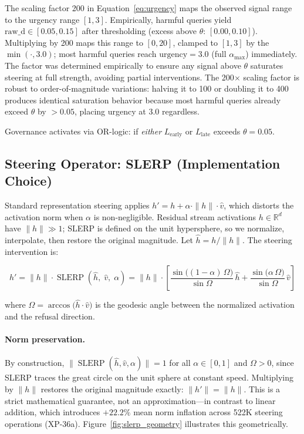 \documentclass{article}
\begin{document}
The scaling factor 200 in Equation~\ref{eq:urgency} maps the observed signal range
to the urgency range $[1, 3]$.
Empirically, harmful queries yield $\text{raw\_d} \in [0.05, 0.15]$ after thresholding
(excess above $\theta$: $[0.00, 0.10]$).
Multiplying by 200 maps this range to $[0, 20]$, clamped to $[1, 3]$ by the $\min(\cdot, 3.0)$;
most harmful queries reach $\text{urgency} = 3.0$ (full $\alpha_{\max}$) immediately.
The factor was determined empirically to ensure any signal above $\theta$ saturates steering
at full strength, avoiding partial interventions.
The 200$\times$ scaling factor is robust to order-of-magnitude variations:
halving it to 100 or doubling it to 400 produces identical saturation
behavior because most harmful queries already exceed $\theta$ by
$>0.05$, placing urgency at 3.0 regardless.

Governance activates via OR-logic: if \textit{either} $L_\text{early}$ or
$L_\text{late}$ exceeds $\theta = 0.05$.

\subsection{Steering Operator: SLERP (Implementation Choice)}
\label{subsec:slerp}

Standard representation steering applies $h' = h + \alpha \cdot \|h\| \cdot \hat{v}$,
which distorts the activation norm when $\alpha$ is non-negligible.
Residual stream activations $h \in \mathbb{R}^d$ have $\|h\| \gg 1$; SLERP is
defined on the unit hypersphere, so we normalize, interpolate, then restore
the original magnitude.
Let $\hat{h} = h / \|h\|$.
The steering intervention is:

\begin{equation}
h' = \|h\| \cdot \operatorname{SLERP}(\hat{h},\; \hat{v},\; \alpha)
   = \|h\| \cdot \left[
       \frac{\sin\!\bigl((1-\alpha)\,\Omega\bigr)}{\sin\Omega}\,\hat{h}
     + \frac{\sin\!\bigl(\alpha\,\Omega\bigr)}{\sin\Omega}\,\hat{v}
     \right]
\label{eq:slerp}
\end{equation}

where $\Omega = \arccos\!\bigl(\hat{h} \cdot \hat{v}\bigr)$ is the geodesic
angle between the normalized activation and the refusal direction.

\paragraph{Norm preservation.}
By construction, $\|\operatorname{SLERP}(\hat{h}, \hat{v}, \alpha)\| = 1$
for all $\alpha \in [0,1]$ and $\Omega > 0$, since SLERP traces the great
circle on the unit sphere at constant speed.
Multiplying by $\|h\|$ restores the original magnitude exactly:
$\|h'\| = \|h\|$.
This is a strict mathematical guarantee, not an approximation---in contrast to
linear addition, which introduces $+22.2\%$ mean norm inflation across
522K steering operations (XP-36a).
Figure~\ref{fig:slerp_geometry} illustrates this geometrically.
\end{document}
